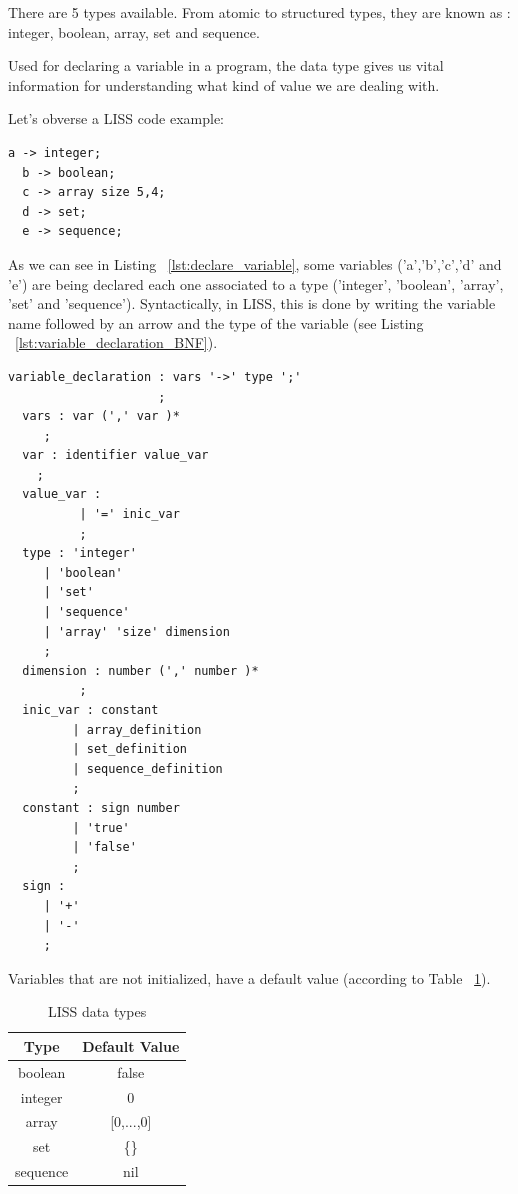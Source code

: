 \documentclass[
  oneside,
  11pt, a4paper,
  footinclude=true,
  headinclude=true,
  cleardoublepage=empty
]{scrbook}
\begin{document}
There are 5 types available.
From atomic to structured types, they are known as : integer, boolean, array, set and sequence.

Used for declaring a variable in a program, the data type gives us vital information for understanding what kind of value we are dealing with.

Let's obverse a LISS code example:

\begin{lstlisting}[caption={Declaring a variable in LISS},label={lst:declare_variable}]
  a -> integer;
  b -> boolean;
  c -> array size 5,4;
  d -> set;
  e -> sequence;
\end{lstlisting}

As we can see in Listing ~\ref{lst:declare_variable}, some variables ('a','b','c','d' and 'e')  are being declared each one associated to a type ('integer', 'boolean', 'array', 'set' and 'sequence').
Syntactically, in LISS, this is done by writing the variable name followed by an arrow and the type of the variable (see Listing ~\ref{lst:variable_declaration_BNF}).

\begin{lstlisting}[caption={CFG for declaring a variable in LISS},label={lst:variable_declaration_BNF}]
  variable_declaration : vars '->' type ';'
                     ;
  vars : var (',' var )*
     ;
  var : identifier value_var
    ;
  value_var :
          | '=' inic_var
          ;
  type : 'integer'
     | 'boolean'
     | 'set'
     | 'sequence'
     | 'array' 'size' dimension
     ;
  dimension : number (',' number )*
          ;
  inic_var : constant
         | array_definition
         | set_definition
         | sequence_definition
         ;
  constant : sign number
         | 'true'
         | 'false'
         ;
  sign :
     | '+'
     | '-'
     ;

\end{lstlisting}

Variables that are not initialized, have a default value (according to Table ~\ref{tbl:data_types}).

\begin{table}[]
\centering
\caption{LISS data types}
\label{tbl:data_types}
\begin{tabular}{|c|c|}
\hline
\textbf{Type}       & \multicolumn{1}{l|}{\textbf{Default Value}} \\ \hline
boolean             & false                                       \\ \hline
integer             & 0                                           \\ \hline
array               & {[}0,...,0{]}                               \\ \hline
set                 & \{\}                                        \\ \hline
sequence            & nil                                         \\ \hline
\end{tabular}
\end{table}
\end{document}
